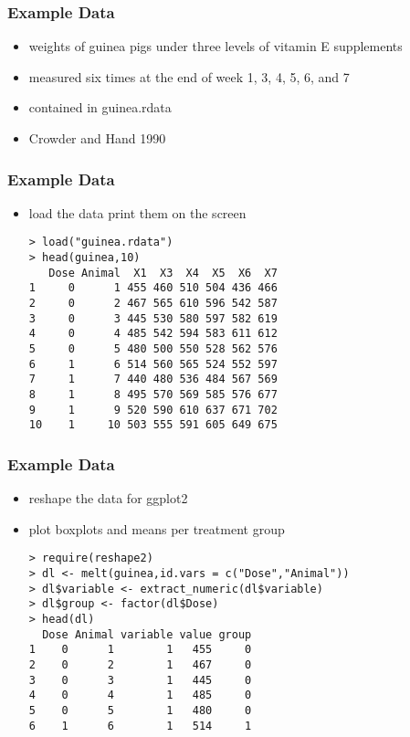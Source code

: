 \begin{frame}\frametitle{Example Data}
  \begin{itemize}
  \item weights of guinea pigs under three levels of vitamin E supplements
  \item measured six times at the end of week 1, 3, 4, 5, 6, and 7
  \item contained in guinea.rdata
  \item Crowder and Hand 1990
  \end{itemize}
\end{frame}


\begin{frame}[fragile]\frametitle{Example Data}
  \begin{itemize}
  \item load the data print them on the screen \scriptsize
\begin{verbatim}
> load("guinea.rdata")
> head(guinea,10)
   Dose Animal  X1  X3  X4  X5  X6  X7
1     0      1 455 460 510 504 436 466
2     0      2 467 565 610 596 542 587
3     0      3 445 530 580 597 582 619
4     0      4 485 542 594 583 611 612
5     0      5 480 500 550 528 562 576
6     1      6 514 560 565 524 552 597
7     1      7 440 480 536 484 567 569
8     1      8 495 570 569 585 576 677
9     1      9 520 590 610 637 671 702
10    1     10 503 555 591 605 649 675
\end{verbatim}
  \end{itemize}
\end{frame}


\begin{frame}[fragile]\frametitle{Example Data}
  \begin{itemize}
  \item reshape the data for ggplot2
  \item plot boxplots and means per treatment group \scriptsize
\begin{verbatim}
> require(reshape2)
> dl <- melt(guinea,id.vars = c("Dose","Animal"))
> dl$variable <- extract_numeric(dl$variable)
> dl$group <- factor(dl$Dose)
> head(dl)
  Dose Animal variable value group
1    0      1        1   455     0
2    0      2        1   467     0
3    0      3        1   445     0
4    0      4        1   485     0
5    0      5        1   480     0
6    1      6        1   514     1
\end{verbatim}
  \end{itemize}
\end{frame}


